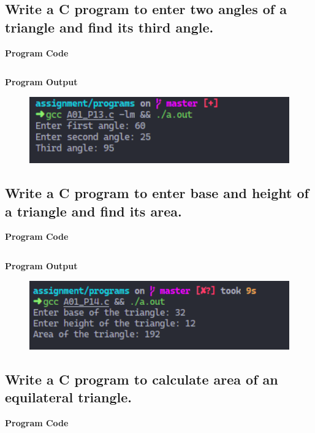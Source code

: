 \documentclass[a4paper, onecolumn]{article}
\begin{document}
\newpage



\subsection{Write a C program to enter two angles of a triangle and find its third angle.}
\textbf{Program Code}

\inputminted{C}{programs/A01_P13.c}

\textbf{Program Output}

\begin{figure}[h]
  \includegraphics[width=12cm]{A01_P13}
\end{figure}

\newpage



\subsection{Write a C program to enter base and height of a triangle and find its area.}
\textbf{Program Code}

\inputminted{C}{programs/A01_P14.c}

\textbf{Program Output}

\begin{figure}[h]
  \includegraphics[width=12cm]{A01_P14}
\end{figure}

\newpage



\subsection{Write a C program to calculate area of an equilateral triangle.}
\textbf{Program Code}
\end{document}
